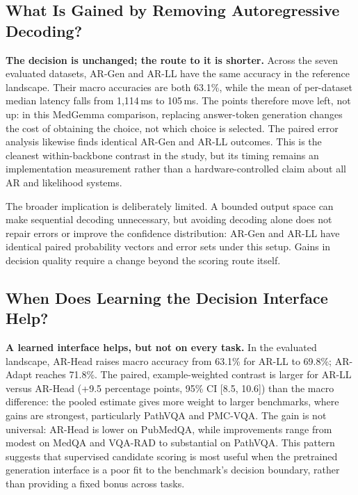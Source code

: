 \subsection{What Is Gained by Removing Autoregressive Decoding?}
\label{sec:rq1}

\textbf{The decision is unchanged; the route to it is shorter.} Across the seven evaluated datasets, AR-Gen and AR-LL have the same accuracy in the reference landscape. Their macro accuracies are both 63.1\%, while the mean of per-dataset median latency falls from 1,114\,ms to 105\,ms. The points therefore move left, not up: in this MedGemma comparison, replacing answer-token generation changes the cost of obtaining the choice, not which choice is selected. The paired error analysis likewise finds identical AR-Gen and AR-LL outcomes. This is the cleanest within-backbone contrast in the study, but its timing remains an implementation measurement rather than a hardware-controlled claim about all AR and likelihood systems.

The broader implication is deliberately limited. A bounded output space can make sequential decoding unnecessary, but avoiding decoding alone does not repair errors or improve the confidence distribution: AR-Gen and AR-LL have identical paired probability vectors and error sets under this setup. Gains in decision quality require a change beyond the scoring route itself.

\subsection{When Does Learning the Decision Interface Help?}
\label{sec:rq2}

\textbf{A learned interface helps, but not on every task.} In the evaluated landscape, AR-Head raises macro accuracy from 63.1\% for AR-LL to 69.8\%; AR-Adapt reaches 71.8\%. The paired, example-weighted contrast is larger for AR-LL versus AR-Head (+9.5 percentage points, 95\% CI [8.5, 10.6]) than the macro difference: the pooled estimate gives more weight to larger benchmarks, where gains are strongest, particularly PathVQA and PMC-VQA. The gain is not universal: AR-Head is lower on PubMedQA, while improvements range from modest on MedQA and VQA-RAD to substantial on PathVQA. This pattern suggests that supervised candidate scoring is most useful when the pretrained generation interface is a poor fit to the benchmark's decision boundary, rather than providing a fixed bonus across tasks.

